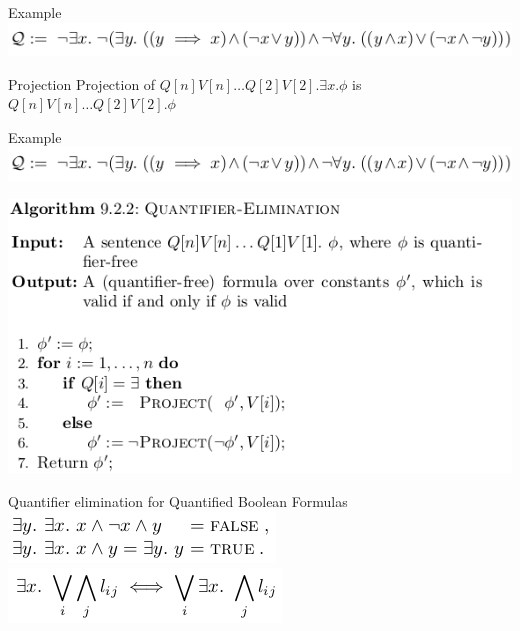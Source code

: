 \documentclass{beamer}
\begin{document}
\begin{frame}{Example}
\includegraphics[scale=0.5]{prenex_example.png}\newline
\end{frame}

\begin{frame}{Projection}
Projection of $Q[n]V[n]\dots Q[2]V[2].\exists x.\phi$\newline
is $Q[n]V[n]\dots Q[2]V[2].\phi$
\end{frame}

\begin{frame}{Example}
\includegraphics[scale=0.5]{prenex_example.png}\newline
\end{frame}

\begin{frame}
\includegraphics[scale=0.5]{quantifier-elimination.png}\newline
\end{frame}

\begin{frame}{Quantifier elimination for Quantified Boolean Formulas}
\includegraphics[scale=0.5]{elem_qbf1.png}\newline
\includegraphics[scale=0.5]{elem_qbf2.png}\newline
\end{frame}
\end{document}
